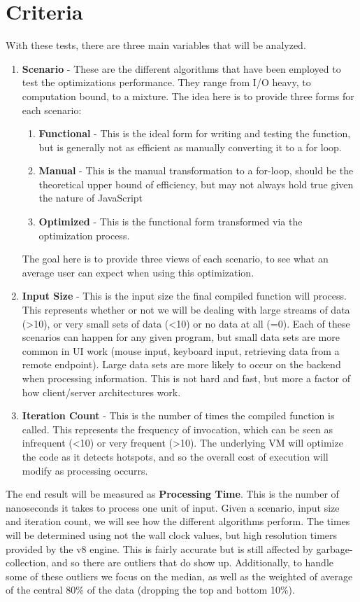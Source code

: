 \section{Criteria}

With these tests, there are three main variables that will be analyzed.

\begin{enumerate}
  \item \textbf{Scenario} - These are the different algorithms that have been employed to test the optimizations performance. They range from I/O heavy, to computation bound, to a mixture.  The idea here is to provide three forms for each scenario:
    \begin{enumerate}
      \item \textbf{Functional} - This is the ideal form for writing and testing the function, but is generally not as efficient as manually converting it to a for loop.
      \item \textbf{Manual} - This is the manual transformation to a for-loop, should be the theoretical upper bound of efficiency, but may not always hold true given the nature of JavaScript
      \item \textbf{Optimized} - This is the functional form transformed via the optimization process.  
    \end{enumerate}
  The goal here is to provide three views of each scenario, to see what an average user can expect when using this optimization.
  \item \textbf{Input Size} - This is the input size the final compiled function will process.  This represents whether or not we will be dealing with large streams of data (>10), or very small sets of data (<10) or no data at all (=0).  Each of these scenarios can happen for any given program, but small data sets are more common in UI work (mouse input, keyboard input, retrieving data from a remote endpoint).  Large data sets are more likely to occur on the backend when processing information. This is not hard and fast, but more a factor of how client/server architectures work. 
  \item \textbf{Iteration Count} - This is the number of times the compiled function is called.  This represents the frequency of invocation, which can be seen as infrequent (<10) or very frequent (>10).  The underlying VM will optimize the code as it detects hotspots, and so the overall cost of execution will modify as processing occurrs.  
\end{enumerate}

The end result will be measured as \textbf{Processing Time}. This is the number of nanoseconds it takes to process one unit of input.  Given a scenario, input size and iteration count, we will see how the different algorithms perform.   The times will be determined using not the wall clock values, but high resolution timers provided by the v8 engine.  This is fairly accurate but is still affected by garbage-collection, and so there are outliers that do show up.  Additionally, to handle some of these outliers we focus on the median, as well as the weighted of average of the central 80\% of the data (dropping the top and bottom 10\%).



